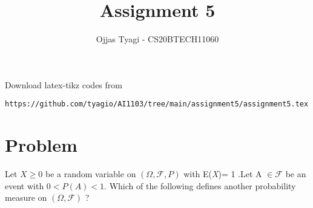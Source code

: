 \documentclass[journal,12pt,twocolumn]{IEEEtran}
\begin{document}
\providecommand{\fourier}{\overset{\mathcal{F}}{ \rightleftharpoons}}
\providecommand{\system}{\overset{\mathcal{H}}{ \longleftrightarrow}}
\newcommand{\solution}{\noindent \textbf{Solution: }}
\newcommand{\cosec}{\,\text{cosec}\,}
\providecommand{\dec}[2]{\ensuremath{\overset{#1}{\underset{#2}{\gtrless}}}}
\newcommand{\myvec}[1]{\ensuremath{\begin{pmatrix}#1\end{pmatrix}}}
\newcommand{\mydet}[1]{\ensuremath{\begin{vmatrix}#1\end{vmatrix}}}
\makeatletter
{}
\makeatother
\let\StandardTheFigure\thefigure
\let\vec\mathbf
\renewcommand{\thefigure}{\theproblem}
\def\putbox#1#2#3{\makebox[0in][l]{\makebox[#1][l]{}\raisebox{\baselineskip}[0in][0in]{\raisebox{#2}[0in][0in]{#3}}}}
     \def\rightbox#1{\makebox[0in][r]{#1}}
     \def\centbox#1{\makebox[0in]{#1}}
     \def\topbox#1{\raisebox{-\baselineskip}[0in][0in]{#1}}
     \def\midbox#1{\raisebox{-0.5\baselineskip}[0in][0in]{#1}}
\vspace{3cm}
\title{Assignment 5}
\author{Ojjas Tyagi - CS20BTECH11060}
\maketitle
\newpage
\bigskip
\renewcommand{\thefigure}{\theenumi}
\renewcommand{\thetable}{\theenumi}
Download  latex-tikz codes from 
%
\begin{lstlisting}
https://github.com/tyagio/AI1103/tree/main/assignment5/assignment5.tex
\end{lstlisting}
\section{Problem}
Let \(X \geq 0\) be a random variable on \(  (\Omega,\mathcal{F},P) \) with E(\emph{X})= 1 .Let A \(\in \mathcal{F}\) be an event with \(0<P(A)<1\). Which of the following defines another probability measure on \((\Omega,\mathcal{F})\) ?
\end{document}
